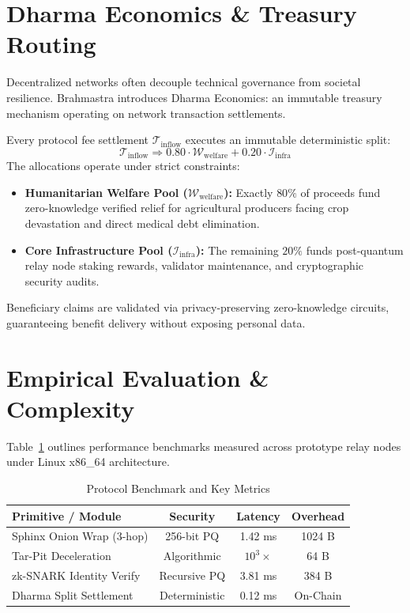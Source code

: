 \documentclass[conference,leqno]{IEEEtran}
\begin{document}
\section{Dharma Economics \& Treasury Routing}
Decentralized networks often decouple technical governance from societal resilience. Brahmastra introduces Dharma Economics: an immutable treasury mechanism operating on network transaction settlements.

Every protocol fee settlement $\mathcal{T}_{\text{inflow}}$ executes an immutable deterministic split:
\begin{equation}
\mathcal{T}_{\text{inflow}} \Longrightarrow 0.80 \cdot \mathcal{W}_{\text{welfare}} + 0.20 \cdot \mathcal{I}_{\text{infra}}
\end{equation}
The allocations operate under strict constraints:
\begin{itemize}
    \item \textbf{Humanitarian Welfare Pool ($\mathcal{W}_{\text{welfare}}$):} Exactly $80\%$ of proceeds fund zero-knowledge verified relief for agricultural producers facing crop devastation and direct medical debt elimination.
    \item \textbf{Core Infrastructure Pool ($\mathcal{I}_{\text{infra}}$):} The remaining $20\%$ funds post-quantum relay node staking rewards, validator maintenance, and cryptographic security audits.
\end{itemize}
Beneficiary claims are validated via privacy-preserving zero-knowledge circuits, guaranteeing benefit delivery without exposing personal data.

\section{Empirical Evaluation \& Complexity}
Table~\ref{tab:metrics} outlines performance benchmarks measured across prototype relay nodes under Linux x86\_64 architecture.

\begin{table}[htbp]
\caption{Protocol Benchmark and Key Metrics}
\label{tab:metrics}
\centering
\begin{tabular}{|l|c|c|c|}
\hline
\textbf{Primitive / Module} & \textbf{Security} & \textbf{Latency} & \textbf{Overhead} \\
\hline
Sphinx Onion Wrap (3-hop) & 256-bit PQ & 1.42 ms & 1024 B \\
Tar-Pit Deceleration & Algorithmic & $10^3\times$ & 64 B \\
zk-SNARK Identity Verify & Recursive PQ & 3.81 ms & 384 B \\
Dharma Split Settlement & Deterministic & 0.12 ms & On-Chain \\
\hline
\end{tabular}
\end{table}
\end{document}
